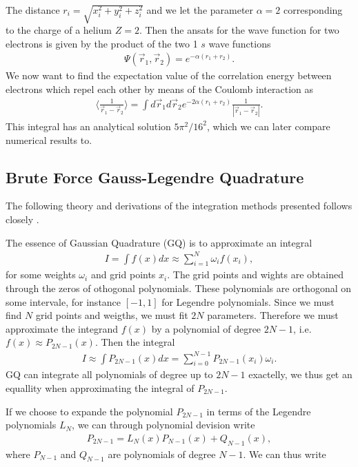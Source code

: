 \documentclass[twocolumn]{aastex62}
\begin{document}
The distance $r_i = \sqrt{x_i^2 + y_i^2 + z_i^2}$ and we let the parameter
$\alpha = 2$ corresponding to the charge of a helium $Z = 2$. Then the ansats
for the wave function for two electrons is given by the product of the two 1 $s$
wave functions 
\begin{align}
	\Psi(\vec{r}_1, \vec{r}_2) = e^{-\alpha(r_1 + r_2)}.
\end{align}
We now want to find the expectation value of the correlation energy between
electrons which repel each other by means of the Coulomb interaction as 
\begin{align}
\langle \frac{
1}{\vec{r}_1 - \vec{r}_2}\rangle = \int d\vec{r}_1d\vec{r}_2 e^{-2\alpha(r_1 + r_2)}\frac{1}{|\vec{r}_1 - \vec{r}_2|}.
\label{eq:integral}
\end{align}
This integral has an analytical solution $5\pi^2/16^2$, which we can later
compare numerical results to.
\subsection{Brute Force Gauss-Legendre Quadrature}\label{subsec:brute_force_gauss}
The following theory and derivations of the integration methods presented
follows closely \citep[Ch. 5.3]{jensen:2015}. 

The essence of Gaussian Quadrature (GQ) is to approximate an integral 
\begin{align}
	I = \int f(x) dx \approx \sum^N_{i = 1} \omega_i f(x_i),
	\label{eq:quadrature}
\end{align} 
for some weights $\omega_i$ and grid points $x_i$. The grid points and wights
are obtained through the zeros of othogonal polynomials. These polynomials are
orthogonal on some intervale, for instance $[-1, 1]$ for Legendre polynomials.
Since we must find $N$ grid points and weigths, we must fit $2N$ parameters.
Therefore we must approximate the integrand $f(x)$ by a polynomial of degree
$2N-1$, i.e. $f(x) \approx P_{2N-1}(x)$. Then the integral 
\begin{align}
	I \approx \int P_{2N-1}(x)dx = \sum^{N-1}_{i=0}P_{2N-1}(x_i) \omega_i.
\end{align} 
GQ can integrate all polynomials of degree up to $2N-1$ exactelly, we thus get
an equallity when approximating the integral of $P_{2N-1}$. 

If we choose to expande the polynomial $P_{2N-1}$ in terms of the Legendre
polynomials $L_N$, we can through polynomial devision write 
\begin{align}
	P_{2N-1} = L_N(x)P_{N-1}(x) + Q_{N-1}(x),
\end{align}
where $P_{N-1}$ and $Q_{N-1}$ are polynomials of degree $N-1$. We can thus write
\end{document}
